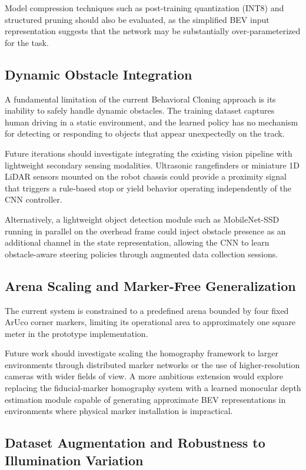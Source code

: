 Model compression techniques such as post-training quantization (INT8) and structured pruning should also be evaluated, as the simplified BEV input representation suggests that the network may be substantially over-parameterized for the task.

\subsection{Dynamic Obstacle Integration}

A fundamental limitation of the current Behavioral Cloning approach is its inability to safely handle dynamic obstacles. The training dataset captures human driving in a static environment, and the learned policy has no mechanism for detecting or responding to objects that appear unexpectedly on the track.

Future iterations should investigate integrating the existing vision pipeline with lightweight secondary sensing modalities. Ultrasonic rangefinders or miniature 1D LiDAR sensors mounted on the robot chassis could provide a proximity signal that triggers a rule-based stop or yield behavior operating independently of the CNN controller.

Alternatively, a lightweight object detection module such as MobileNet-SSD running in parallel on the overhead frame could inject obstacle presence as an additional channel in the state representation, allowing the CNN to learn obstacle-aware steering policies through augmented data collection sessions.

\subsection{Arena Scaling and Marker-Free Generalization}

The current system is constrained to a predefined arena bounded by four fixed ArUco corner markers, limiting its operational area to approximately one square meter in the prototype implementation.

Future work should investigate scaling the homography framework to larger environments through distributed marker networks or the use of higher-resolution cameras with wider fields of view. A more ambitious extension would explore replacing the fiducial-marker homography system with a learned monocular depth estimation module capable of generating approximate BEV representations in environments where physical marker installation is impractical.

\subsection{Dataset Augmentation and Robustness to Illumination Variation}


